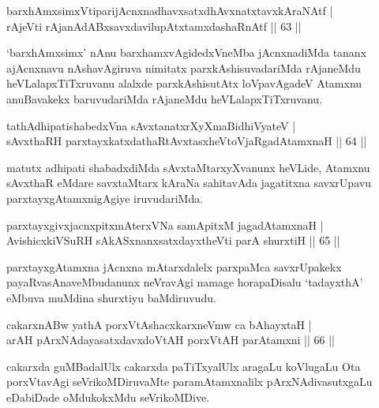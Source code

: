 

\begin{shl}
barxhAmxsimxVtiparijAcnxnadhavxsatxdhAvxnatxtavxkAraNAtf |\\
rAjeVti rAjanAdABxsavxdavilupAtxtamxdashaRnAtf \hfill || 63 ||
\end{shl}
\begin{artha}
`barxhAmxsimx' nAnu barxhamxvAgidedxVneMba jAcnxnadiMda tananx   ajAcnxnavu nAshavAgiruva nimitatx parxkAshisuvadariMda rAjaneMdu   heVLalapxTiTxruvanu alalxde parxkAshisutAtx loVpavAgadeV Atamxnu   anuBavakekx baruvudariMda rAjaneMdu heVLalapxTiTxruvanu.
\end{artha}


\begin{shl}
tathA\s dhipatishabedxVna sAvxtanatxrXyXmaBidhiVyateV |\\
sAvxthaRH parxtayxkatxdathaRtAvxtasxheVtoVjaRgadAtamxnaH \hfill || 64 ||
\end{shl}	

\begin{artha}
matutx adhipati shabadxdiMda sAvxtaMtarxyXvanunx heVLide, Atamxnu sAvxthaR eMdare savxtaMtarx kAraNa sahitavAda jagatitxna savxrUpavu parxtayxgAtamxnigAgiye iruvudariMda.
\end{artha}


\begin{shl}
parxtayxgivxjacnxpitxmAterxVNa samApitxM jagadAtamxnaH |\\
AvishicxkiVSuRH sAkASxnanxsatxdayxtheVti parA shurxtiH \hfill || 65 ||
\end{shl}

\begin{artha}
parxtayxgAtamxna jAcnxna mAtarxdalelx parxpaMca savxrUpakekx
payaRvasAnaveMbudanunx neVravAgi namage horapaDisalu `tadayxthA' eMbuva
muMdina shurxtiyu baMdiruvudu.
\end{artha}

\begin{shl}
cakarxnABw yathA porxVtAshacxkarxneVmw ca bAhayxtaH |\\
arAH pArxNAdayasatxdavxdoVtAH porxVtAH parAtamxni \hfill || 66 ||
\end{shl}

\begin{artha}
cakarxda guMBadalUlx cakarxda paTiTxyalUlx aragaLu koVlugaLu Ota porxVtavAgi seVrikoMDiruvaMte paramAtamxnalilx pArxNAdivasutxgaLu eDabiDade oMdukokxMdu seVrikoMDive.
\end{artha}

